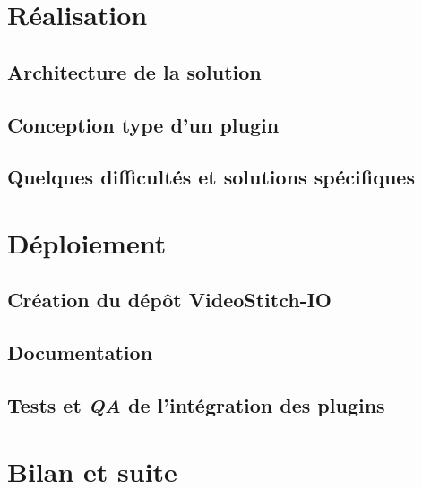 \section{Réalisation}
\subsection{Architecture de la solution}

\subsection{Conception type d'un plugin}

\subsection{Quelques difficultés et solutions spécifiques}


\section{Déploiement}
\subsection{Création du dépôt VideoStitch-IO}

\subsection{Documentation}

\subsection{Tests et \textit{QA} de l'intégration des plugins}


\section{Bilan et suite}

